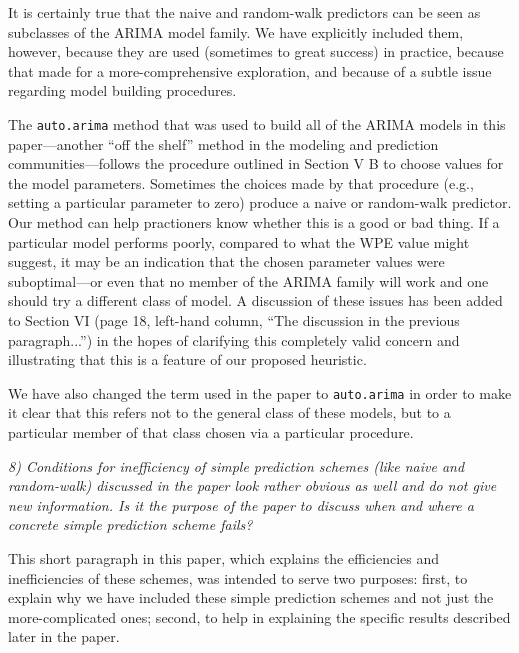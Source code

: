 \documentclass[12pt]{article}
\begin{document}
It is certainly true that the naive and random-walk predictors can be
seen as subclasses of the ARIMA model family.  We have explicitly
included them, however, because they are used (sometimes to great
success) in practice, because that made for a more-comprehensive
exploration, and because of a subtle issue regarding model building
procedures.

The {\tt auto.arima} method that was used to build all of the ARIMA
models in this paper---another ``off the shelf'' method in the
modeling and prediction communities---follows the procedure outlined
in Section V B to choose values for the model parameters.  Sometimes
the choices made by that procedure (e.g., setting a particular
parameter to zero) produce a naive or random-walk predictor.  Our
method can help practioners know whether this is a good or bad thing.
If a particular model performs poorly, compared to what the WPE value
might suggest, it may be an indication that the chosen parameter
values were suboptimal---or even that no member of the ARIMA family
will work and one should try a different class of model.  A discussion
of these issues has been added to Section VI (page 18, left-hand
column, ``The discussion in the previous paragraph...'') in the hopes
of clarifying this completely valid concern and illustrating that this
is a feature of our proposed heuristic.


We have also changed the term used in the paper to {\tt auto.arima} in
order to make it clear that this refers not to the general class of
these models, but to a particular member of that class chosen via a
particular procedure.

\smallskip

\emph{8) Conditions for inefficiency of simple prediction schemes
  (like naive and random-walk) discussed in the paper look rather
  obvious as well and do not give new information. Is it the purpose
  of the paper to discuss when and where a concrete simple prediction
  scheme fails?}

This short paragraph in this paper, which explains the efficiencies
and inefficiencies of these schemes, was intended to serve two
purposes: first, to explain why we have included these simple
prediction schemes and not just the more-complicated ones; second, to
help in explaining the specific results described later in the paper.
\end{document}
